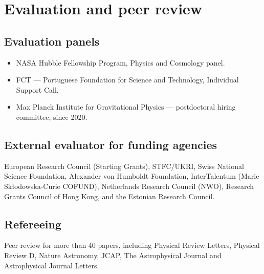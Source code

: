 \documentclass[11pt,a4paper]{article}
\newenvironment{plainlist}
  {\begin{itemize}[leftmargin=1.1em,itemsep=0.2em,parsep=0pt,topsep=0.3em]}
  {\end{itemize}}
\begin{document}
\section{Evaluation and peer review}

\subsection{Evaluation panels}
\begin{plainlist}
  \item NASA Hubble Fellowship Program, Physics and Cosmology panel.
  \item FCT --- Portuguese Foundation for Science and Technology, Individual Support Call.
  \item Max Planck Institute for Gravitational Physics --- postdoctoral hiring committee, since 2020.
\end{plainlist}

\subsection{External evaluator for funding agencies}
European Research Council (Starting Grants), STFC/UKRI, Swiss National Science Foundation,
Alexander von Humboldt Foundation, InterTalentum (Marie Skłodowska-Curie COFUND),
Netherlands Research Council (NWO), Research Grants Council of Hong Kong, and the
Estonian Research Council.

\subsection{Refereeing}
Peer review for more than 40 papers, including Physical Review Letters, Physical Review D,
Nature Astronomy, JCAP, The Astrophysical Journal and Astrophysical Journal Letters.

\end{document}
